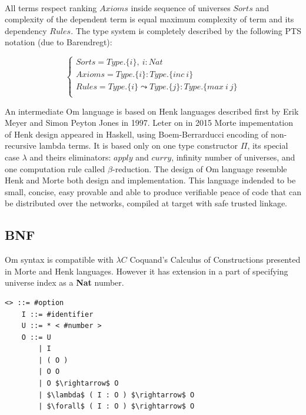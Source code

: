 \documentclass[11pt,oneside]{article}
\begin{document}
   \paragraph{}
   All terms respect ranking $Axioms$ inside sequence of universes $Sorts$ and complexity of the
   dependent term is equal maximum complexity of term and its dependency $Rules$. The type
   system is completely described by the following PTS notation (due to Barendregt):

$$
\begin{cases}
    Sorts = Type.\{i\},\ i : Nat\\
    Axioms = Type.\{i\} : Type.\{inc\ i\}\\
    Rules = Type.\{i\} \leadsto Type.\{j\} : Type.\{max\ i\ j\}\\
\end{cases}
$$

   An intermediate Om language is based on Henk\cite{henk} languages described first
   by Erik Meyer and Simon Peyton Jones in 1997. Leter on in 2015 Morte impementation
   of Henk design appeared in Haskell, using Boem-Berrarducci encoding of non-recursive lambda terms.
   It is based only on one type constructor $\Pi$, its special case $\lambda$ and theirs eliminators:
   $apply$ and $curry$, infinity number of universes,
   and one computation rule called $\beta$-reduction.
   The design of Om language resemble Henk and Morte both
   design and implementation. This language indended to be small, concise, easy provable
   and able to produce verifiable peace of code that can be distributed over the networks,
   compiled at target with safe trusted linkage.

   \subsection{BNF}
\vspace{0.5cm}
   Om syntax is compatible with $\lambda C$ Coquand's Calculus of Constructions presented
   in Morte and Henk languages. However it has extension in a part of specifying
   universe index as a {\bf Nat} number.

\vspace{0.5cm}
\begin{lstlisting}[mathescape=true]
   <> ::= #option
    I ::= #identifier
    U ::= * < #number >
    O ::= U
        | I
        | ( O )
        | O O
        | O $\rightarrow$ O
        | $\lambda$ ( I : O ) $\rightarrow$ O
        | $\forall$ ( I : O ) $\rightarrow$ O
\end{lstlisting}
\end{document}
